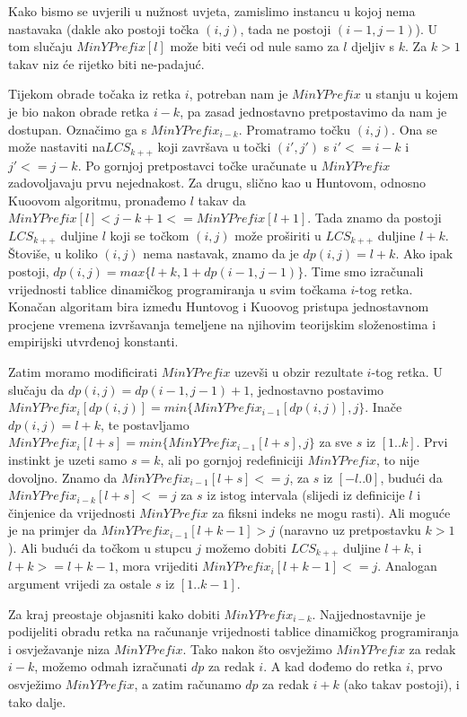 \documentclass[times, utf8, seminar, numeric]{fer}
\begin{document}
Kako bismo se uvjerili u nužnost uvjeta, zamislimo instancu u kojoj
nema nastavaka (dakle ako postoji točka $(i, j)$, tada ne postoji
$(i-1, j-1)$). U tom slučaju $MinYPrefix[l]$ može biti veći od
nule samo za $l$ djeljiv s $k$. Za $k > 1$ takav niz će rijetko
biti ne-padajuć.

Tijekom obrade točaka iz retka $i$, potreban nam je $MinYPrefix$ u
stanju u kojem je bio nakon obrade retka $i-k$, pa zasad
jednostavno pretpostavimo da nam je dostupan. Označimo ga s
$MinYPrefix_{i-k}$. Promatramo točku $(i, j)$. Ona se može
nastaviti na$ LCS_{k++}$ koji završava u točki $(i', j')$ s $i' <=
i - k$ i $j' <= j - k$. Po gornjoj pretpostavci točke uračunate u
$MinYPrefix$ zadovoljavaju prvu nejednakost. Za drugu, slično kao
u Huntovom, odnosno Kuoovom algoritmu, pronađemo $l$ takav da
$MinYPrefix[l] < j - k + 1 <= MinYPrefix[l+1]$. Tada znamo da
postoji $LCS_{k++}$ duljine $l$ koji se točkom $(i, j)$ može
proširiti u $LCS_{k++}$ duljine $l+k$. Štoviše, u koliko $(i, j)$
nema nastavak, znamo da je $dp(i, j) = l+k$.  Ako ipak postoji,
$dp(i, j) = max\{l+k, 1+dp(i-1, j-1)\}$. Time smo izračunali
vrijednosti tablice dinamičkog programiranja u svim točkama
$i$-tog retka. Konačan algoritam bira između Huntovog i Kuoovog
pristupa jednostavnom procjene vremena izvršavanja temeljene na
njihovim teorijskim složenostima i empirijski utvrđenoj konstanti.

Zatim moramo modificirati $MinYPrefix$ uzevši u obzir rezultate
$i$-tog retka. U slučaju da $dp(i, j) = dp(i-1,j-1)+1$,
jednostavno postavimo $MinYPrefix_i[dp(i,j)] =
min\{MinYPrefix_{i-1}[dp(i,j)], j\}$.  Inače $dp(i, j) = l+k$, te
postavljamo $MinYPrefix_i[l+s] = min\{MinYPrefix_{i-1}[l+s], j\}$
za sve $s$ iz $[1..k]$. Prvi instinkt je uzeti samo $s = k$, ali
po gornjoj redefiniciji $MinYPrefix$, to nije dovoljno. Znamo da
$MinYPrefix_{i-1}[l+s] <= j$, za $s$ iz $[-l..0]$, budući da
$MinYPrefix_{i-k}[l+s] <= j$ za $s$ iz istog intervala (slijedi iz
definicije $l$ i činjenice da vrijednosti $MinYPrefix$ za fiksni
indeks ne mogu rasti). Ali moguće je na primjer da
$MinYPrefix_{i-1}[l+k-1] > j$ (naravno uz pretpostavku $k > 1$).
Ali budući da točkom u stupcu $j$ možemo dobiti $LCS_{k++}$ duljine
$l+k$, i $l+k >= l+k-1$, mora vrijediti $MinYPrefix_i[l+k-1] <= j$.
Analogan argument vrijedi za ostale $s$ iz $[1..k-1]$.

Za kraj preostaje objasniti kako dobiti $MinYPrefix_{i-k}$.
Najjednostavnije je podijeliti obradu retka na računanje
vrijednosti tablice dinamičkog programiranja i osvježavanje niza
$MinYPrefix$. Tako nakon što osvježimo $MinYPrefix$ za redak
$i-k$, možemo odmah izračunati $dp$ za redak $i$. A kad dođemo do
retka $i$, prvo osvježimo $MinYPrefix$, a zatim računamo $dp$ za
redak $i+k$ (ako takav postoji), i tako dalje.
\end{document}
